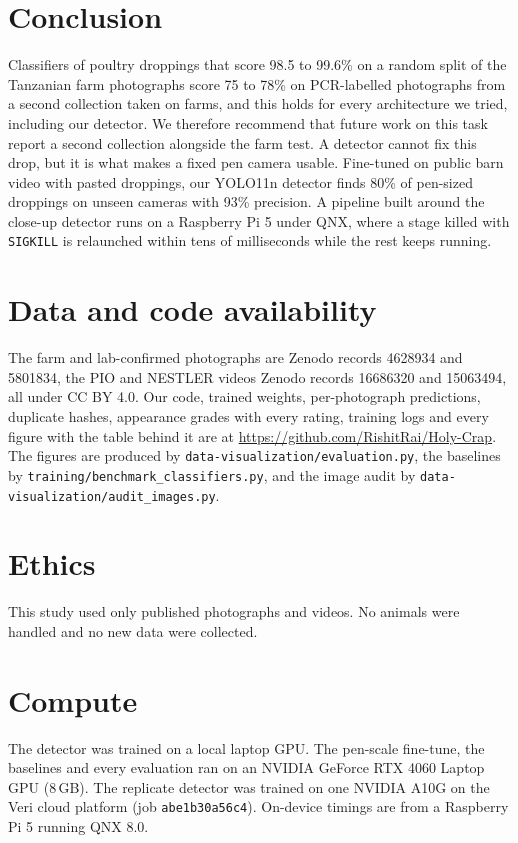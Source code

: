 \documentclass[10pt,twocolumn]{article}
\begin{document}
\section{Conclusion}
\label{sec:conclusion}

Classifiers of poultry droppings that score 98.5 to 99.6\% on a random split of the Tanzanian farm photographs score
75 to 78\% on PCR-labelled photographs from a second collection taken on farms, and this holds for every architecture
we tried, including our detector. We therefore recommend that future work on this task report a second collection
alongside the farm test. A detector cannot fix this drop, but it is what makes a fixed pen camera usable. Fine-tuned
on public barn video with pasted droppings, our YOLO11n detector finds 80\% of pen-sized droppings on unseen cameras
with 93\% precision. A pipeline built around the close-up detector runs on a Raspberry Pi 5 under QNX, where a stage
killed with \texttt{SIGKILL} is relaunched within tens of milliseconds while the rest keeps running.


\section*{Data and code availability}
The farm and lab-confirmed photographs are Zenodo records 4628934 and 5801834, the PIO and NESTLER videos Zenodo
records 16686320 and 15063494, all under CC BY 4.0. Our code, trained weights, per-photograph predictions,
duplicate hashes, appearance grades with every rating, training logs and every figure with the table behind it are at
\url{https://github.com/RishitRai/Holy-Crap}. The figures
are produced by \texttt{data-visualization/evaluation.py}, the baselines by
\texttt{training/benchmark\_classifiers.py}, and the image audit by \texttt{data-visualization/audit\_images.py}.

\section*{Ethics}
This study used only published photographs and videos. No animals were handled and no new data were collected.

\section*{Compute}
The detector was trained on a local laptop GPU. The pen-scale fine-tune, the baselines and every evaluation ran on an
NVIDIA GeForce RTX 4060 Laptop GPU (8\,GB). The replicate detector was trained on one NVIDIA A10G on the Veri cloud
platform (job \texttt{abe1b30a56c4}). On-device timings are from a Raspberry Pi 5 running QNX 8.0.
\end{document}
